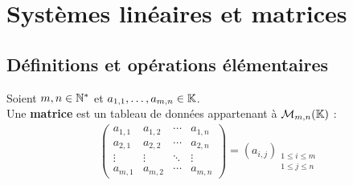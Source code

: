 \chapter{Systèmes linéaires et matrices}
\def\arraystretch{1}

\section{Définitions et opérations élémentaires}
\begin{definition}[Matrice]
	Soient $m, n \in \mathbb{N}^*$ et $a_{1,1}, \ldots, a_{m,n} \in \mathbb{K}$. 
	\\
    Une \textbf{matrice} est un tableau de données appartenant à $\mathcal{M}_{m,n} (\mathbb{K})$ :
    \begin{align*}
        \begin{pmatrix}
            a_{1,1} & a_{1,2} & \cdots & a_{1,n} \\
            a_{2,1} & a_{2,2} & \cdots & a_{2,n} \\
            \vdots & \vdots & \ddots & \vdots \\
            a_{m,1} & a_{m,2} & \cdots & a_{m,n}
        \end{pmatrix}
        = 
        (a_{i,j})_{\substack{1 \leq i \leq m \\ 1 \leq j \leq n}}
    \end{align*}
\end{definition}

